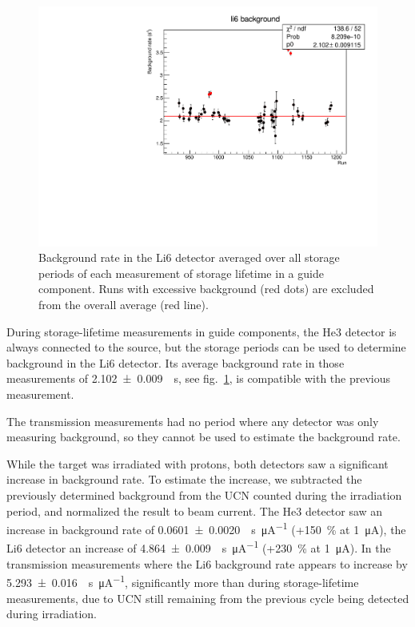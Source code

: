 \documentclass[10pt,letterpaper]{article}
\begin{document}
\begin{figure}
\centering
\includegraphics[width=\textwidth]{../storagelifetime_with_monitor/li6_background.pdf}
\caption{Background rate in the Li6 detector averaged over all storage periods of each measurement of storage lifetime in a guide component. Runs with excessive background (red dots) are excluded from the overall average (red line).}
\label{fig:background2}
\end{figure}

During storage-lifetime measurements in guide components, the He3 detector is always connected to the source, but the storage periods can be used to determine background in the Li6 detector. Its average background rate in those measurements of \SI{2.102 +- 0.009}{\per\second}, see fig.~\ref{fig:background2}, is compatible with the previous measurement.

The transmission measurements had no period where any detector was only measuring background, so they cannot be used to estimate the background rate.

While the target was irradiated with protons, both detectors saw a significant increase in background rate. To estimate the increase, we subtracted the previously determined background from the UCN counted during the irradiation period, and normalized the result to beam current. The He3 detector saw an increase in background rate of \SI{0.0601 +- 0.0020}{\per\second\per\micro\ampere} (+\SI{150}{\percent} at \SI{1}{\micro\ampere}), the Li6 detector an increase of \SI{4.864 +- 0.009}{\per\second\per\micro\ampere} (+\SI{230}{\percent} at \SI{1}{\micro\ampere}). In the transmission measurements where the Li6 background rate appears to increase by \SI{5.293 +- 0.016}{\per\second\per\micro\ampere}, significantly more than during storage-lifetime measurements, due to UCN still remaining from the previous cycle being detected during irradiation.
\end{document}
